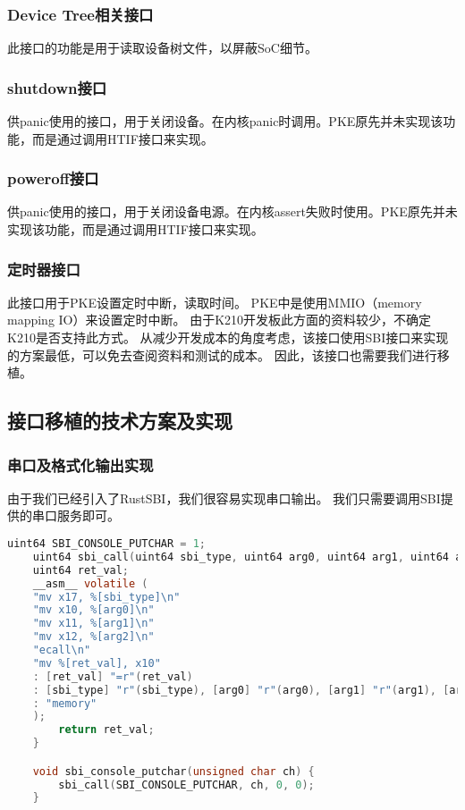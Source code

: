 \subsubsection{Device Tree相关接口}

此接口的功能是用于读取设备树文件，以屏蔽SoC细节。

\subsubsection{shutdown接口}

供panic使用的接口，用于关闭设备。在内核panic时调用。PKE原先并未实现该功能，而是通过调用HTIF接口来实现。

\subsubsection{poweroff接口}

供panic使用的接口，用于关闭设备电源。在内核assert失败时使用。PKE原先并未实现该功能，而是通过调用HTIF接口来实现。

\subsubsection{定时器接口}

此接口用于PKE设置定时中断，读取时间。
PKE中是使用MMIO（memory mapping IO）来设置定时中断。
由于K210开发板此方面的资料较少，不确定K210是否支持此方式。
从减少开发成本的角度考虑，该接口使用SBI接口来实现的方案最低，可以免去查阅资料和测试的成本。
因此，该接口也需要我们进行移植。

\subsection{接口移植的技术方案及实现}

\subsubsection{串口及格式化输出实现}

由于我们已经引入了RustSBI，我们很容易实现串口输出。
我们只需要调用SBI提供的串口服务即可。

\begin{lstlisting}[language=C, caption={串口实现代码}, label={lst:serial_output} ]
    uint64 SBI_CONSOLE_PUTCHAR = 1;
    uint64 sbi_call(uint64 sbi_type, uint64 arg0, uint64 arg1, uint64 arg2) {
    uint64 ret_val;
    __asm__ volatile (
    "mv x17, %[sbi_type]\n"
    "mv x10, %[arg0]\n"
    "mv x11, %[arg1]\n"
    "mv x12, %[arg2]\n"
    "ecall\n"
    "mv %[ret_val], x10"
    : [ret_val] "=r"(ret_val)
    : [sbi_type] "r"(sbi_type), [arg0] "r"(arg0), [arg1] "r"(arg1), [arg2] "r"(arg2)
    : "memory"
    );
        return ret_val;
    }

    void sbi_console_putchar(unsigned char ch) {
        sbi_call(SBI_CONSOLE_PUTCHAR, ch, 0, 0);
    }
\end{lstlisting}

